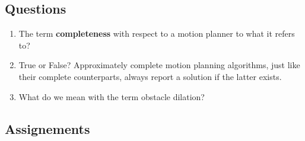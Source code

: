 \subsection{Questions}

\begin{enumerate}
\item The term \textbf{completeness} with respect to a motion planner to what it refers to?
\item True or False? Approximately complete motion planning algorithms, just like their complete counterparts, always report a solution if the latter exists.
\item What do we mean with the term obstacle dilation?
\end{enumerate}
\subsection{Assignements}
